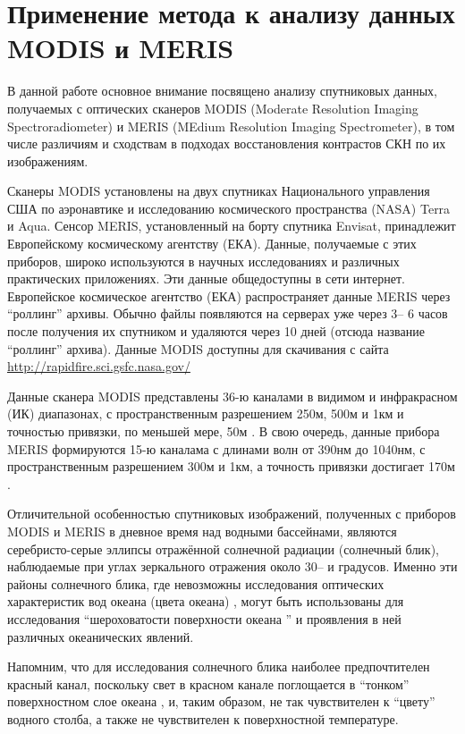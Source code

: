\newpage

\section{Применение метода к анализу данных MODIS и MERIS}



В данной работе основное внимание посвящено анализу спутниковых данных, получаемых с оптических сканеров MODIS (Moderate Resolution Imaging Spectroradiometer) и MERIS (MEdium Resolution Imaging Spectrometer), в том числе различиям и сходствам в подходах восстановления контрастов СКН по их изображениям. 

Сканеры MODIS установлены на двух спутниках Национального управления США по аэронавтике и исследованию космического пространства (NASA) Terra и Aqua. Сенсор MERIS, установленный на борту спутника Envisat, принадлежит Европейскому космическому агентству (ЕКА). Данные, получаемые с этих приборов, широко используются в научных исследованиях и различных практических приложениях. Эти данные общедоступны в сети интернет. Европейское космическое агентство (ЕКА) распространяет данные MERIS через ``роллинг'' архивы. Обычно файлы появляются на серверах уже через 3-- 6 часов после получения их спутником и удаляются через 10 дней (отсюда название ``роллинг'' архива). Данные MODIS доступны для скачивания с сайта \url{http://rapidfire.sci.gsfc.nasa.gov/}

Данные сканера MODIS представлены 36-ю каналами в видимом и инфракрасном (ИК) диапазонах, с пространственным разрешением 250м, 500м и 1км и точностью привязки, по меньшей мере, 50м \citep{Salomonson1989, Wolfe2002}. В свою очередь, данные прибора MERIS формируются 15-ю каналама с длинами волн от 390нм до 1040нм, с пространственным разрешением 300м и 1км, а точность привязки достигает 170м \citep{Goryl2004}.

Отличительной особенностью спутниковых изображений, полученных с приборов MODIS и MERIS в дневное время над водными бассейнами, являются серебристо-серые эллипсы отражённой солнечной радиации (солнечный блик), наблюдаемые при углах зеркального отражения около 30-- и градусов. Именно эти районы солнечного блика, где невозможны исследования оптических характеристик вод океана (цвета океана) \citep{Esaias1998}, могут быть использованы для исследования ``шероховатости поверхности океана '' и проявления в ней различных океанических явлений. 

Напомним, что для исследования солнечного блика наиболее предпочтителен красный канал, поскольку свет в красном канале поглощается в ``тонком'' поверхностном слое океана \citep{Jerlov1976}, и, таким образом, не так чувствителен к ``цвету'' водного столба, а также не чувствителен к поверхностной температуре.

